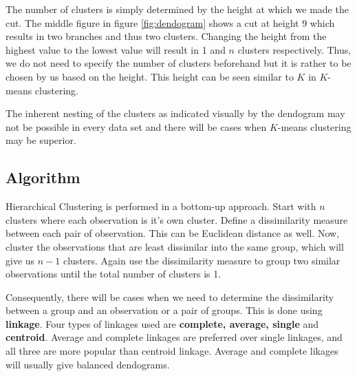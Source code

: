 \documentclass[../statistical_learning_notes.tex]{subfiles}
\begin{document}
    The number of clusters is simply determined by the height at which we made the cut. The middle figure in figure \ref{fig:dendogram} shows a cut at height 9 which results in two branches and thus two clusters.\newline
    Changing the height from the highest value to the lowest value will result in 1 and $n$ clusters respectively. Thus, we do not need to specify the number of clusters beforehand but it is rather to be chosen by us based on the height. This height can be seen similar to $K$ in $K$-means clustering.\newline

    The inherent nesting of the clusters as indicated visually by the dendogram may not be possible in every data set and there will be cases when $K$-means clustering may be superior.


    \subsection{Algorithm}
    Hierarchical Clustering is performed in a bottom-up approach. Start with $n$ clusters where each observation is it's own cluster. Define a dissimilarity measure between each pair of observation. This can be Euclidean distance as well. Now, cluster the observations that are least dissimilar into the same group, which will give us $n-1$ clusters. Again use the dissimilarity measure to group two similar observations until the total number of clusters is 1.\newline

    Consequently, there will be cases when we need to determine the dissimilarity between a group and an observation or a pair of groups. This is done using \textbf{linkage}. Four types of linkages used are \textbf{complete, average, single} and \textbf{centroid}. Average and complete linkages are preferred over single linkages, and all three are more popular than centroid linkage. Average and complete likages will usually give balanced dendograms.\newline
\end{document}

